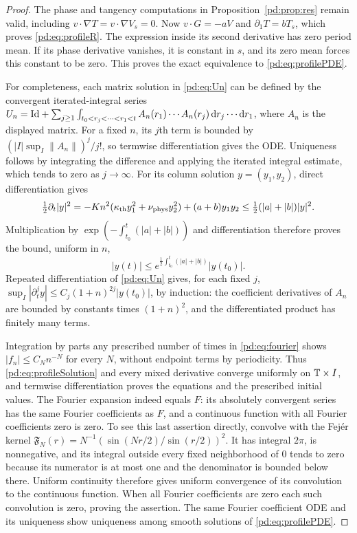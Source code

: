 \begin{proof}
The phase and tangency computations in Proposition~\ref{pd:prop:res} remain
valid, including $v\cdot\nabla T=v\cdot\nabla V_s=0$.
Now $v\cdot G=-aV$ and $\partial_1T=bT_s$, which proves
\eqref{pd:eq:profileR}. The expression inside its second derivative has zero
period mean. If its phase derivative vanishes, it is constant in $s$,
and its zero mean forces this constant to be zero. This proves the exact
equivalence to \eqref{pd:eq:profilePDE}.

For completeness, each matrix solution in \eqref{pd:eq:Un} can be defined by
the convergent iterated-integral series
$U_n=\mathrm{Id}+\sum_{j\geq1}\int_{t_0<r_j<\cdots<r_1<t}
 A_n(r_1)\cdots A_n(r_j)\,\mathrm d r_j\cdots\mathrm d r_1$, where $A_n$ is the
displayed matrix. For a fixed $n$, its $j$th term is bounded by
$(|I|\sup_I\|A_n\|)^j/j!$, so termwise differentiation gives the ODE.
Uniqueness follows by integrating the difference and applying the
iterated integral estimate, which tends to zero as $j\to\infty$.
For its column solution $y=(y_1,y_2)$, direct differentiation gives
\[
 \tfrac12\partial_t|y|^2
 =-Kn^2(\kappa_{\rm th} y_1^2+\nu_{\rm phys} y_2^2)+(a+b)y_1y_2
 \leq \tfrac12(|a|+|b|)|y|^2.
\]
Multiplication by $\exp(-\int_{t_0}^t(|a|+|b|))$ and differentiation
therefore proves the bound, uniform in $n$,
\[
 |y(t)|\leq e^{\frac12\int_{t_0}^t(|a|+|b|)}|y(t_0)|.
\]
Repeated differentiation of \eqref{pd:eq:Un} gives, for each fixed $j$,
$\sup_I|\partial_t^j y|\leq C_j(1+n)^{2j}|y(t_0)|$, by induction:
the coefficient derivatives of $A_n$ are bounded by constants times
$(1+n)^2$, and the differentiated product has finitely many terms.

Integration by parts any prescribed number of times in \eqref{pd:eq:fourier}
shows $|f_n|\leq C_N n^{-N}$ for every $N$, without endpoint terms by
periodicity. Thus \eqref{pd:eq:profileSolution} and every mixed derivative
converge uniformly on $\mathbb T\times I$, and termwise differentiation proves
the equations and the prescribed initial values. The Fourier expansion
indeed equals $F$: its absolutely convergent series has the same Fourier
coefficients as $F$, and a continuous function with all Fourier
coefficients zero is zero. To see this last assertion directly, convolve
with the Fej\'er kernel
$\mathfrak F_N(r)=N^{-1}(\sin(Nr/2)/\sin(r/2))^2$.
It has integral $2\pi$, is nonnegative, and its integral outside every
fixed neighborhood of $0$ tends to zero because its numerator is at
most one and the denominator is bounded below there. Uniform continuity
therefore gives uniform convergence of its convolution to the continuous
function. When all Fourier coefficients are zero each such convolution
is zero, proving the assertion. The same Fourier coefficient ODE and
its uniqueness show uniqueness among smooth solutions of
\eqref{pd:eq:profilePDE}.
\end{proof}

